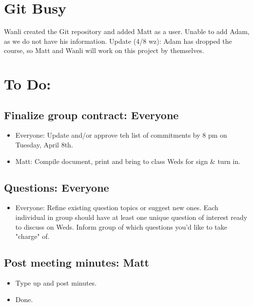 \documentclass{article}
\begin{document}
\section{Git Busy}
Wanli created the Git repository and added Matt as a user.
Unable to add Adam, as we do not have his information.
Update (4/8 wz): Adam has dropped the course, so Matt and Wanli will work on this project by themselves.

\section{To Do:}
\subsection{Finalize group contract: Everyone}
\begin{itemize}
\item Everyone: Update and/or approve teh list of commitments by 8 pm on Tuesday, April 8th.
\item Matt: Compile document, print and bring to class Weds for sign \& turn in.
\end{itemize}

\subsection{Questions: Everyone}
\begin{itemize}
\item Everyone: Refine existing question topics or suggest new ones. Each individual in group should have at least one unique question of interest ready to discuss on Weds. Inform group of which questions you'd like to take "charge" of.
\end{itemize}

\subsection{Post meeting minutes: Matt}
\begin{itemize}
\item Type up and post minutes.
\item Done.
\end{itemize}
\end{document}
